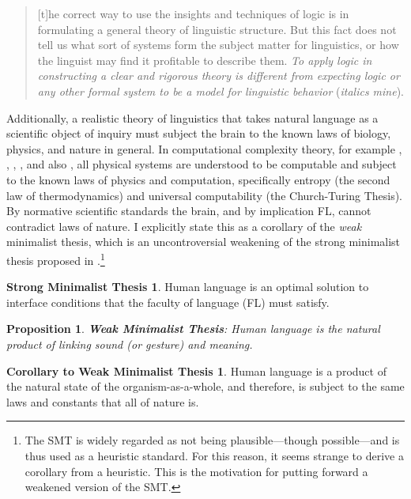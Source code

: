\documentclass[11pt,twoside]{article}
\theoremstyle{plain}
\newtheorem{proposition}{Proposition}
\numberwithin{equation}{section}
\theoremstyle{definition}
\newtheorem{phrase string}{Phrase String}
\begin{document}
\begin{quotation}
[t]he correct way to use the insights and techniques of logic is in formulating a general theory of linguistic structure. But this fact does not tell us what sort of systems form the subject matter for linguistics, or how the linguist may find it 	profitable to describe them. \textsl{To apply logic in constructing a clear and rigorous 	theory is different from expecting logic or any other formal system to be a model for linguistic behavior} (\textsl{italics mine}).
\end{quotation}

Additionally, a realistic theory of linguistics that takes natural language as a scientific object of inquiry must subject the brain to the known laws of biology, physics, and nature in general. In computational complexity theory, for example \cite{deutsch:1985}, \cite{deutsch:1997}, \cite{lloyd:2000}, \cite{lloyd:2006}, and also \cite{kauffman:1995}, all physical systems are understood to be computable and subject to the known laws of physics and computation, specifically entropy (the second law of thermodynamics) and universal computability (the Church-Turing Thesis). By normative scientific standards the brain, and by implication FL, cannot contradict laws of nature. I explicitly state this as a corollary of the \textsl{weak} minimalist thesis, which is an uncontroversial weakening of the strong minimalist thesis proposed in \cite{chomsky08onphases}.\footnote{The SMT is widely regarded as not being plausible---though possible---and is thus used as a heuristic standard. For this reason, it seems strange to derive a corollary from a heuristic. This is the motivation for putting forward a weakened version of the SMT.}

\newtheorem*{smt}{Strong Minimalist Thesis}
\begin{smt}
	Human language is an optimal solution to interface conditions that the faculty of language (FL) must satisfy.
\end{smt}

\begin{proposition}
\textbf{Weak Minimalist Thesis}: Human language is the natural product of linking sound (or gesture) and meaning.
\end{proposition}

\newtheorem*{coroll}{Corollary to Weak Minimalist Thesis}
\begin{coroll}
Human language is a product of the natural state of the organism-as-a-whole, and therefore, is subject to the same laws and constants that all of nature is.
\end{coroll}
\end{document}
